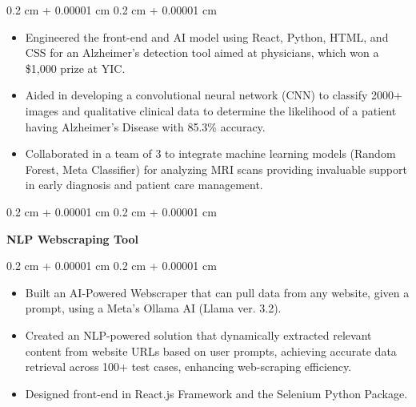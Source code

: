 \documentclass[10pt, letterpaper]{article}
\newenvironment{highlights}{
    \begin{itemize}[
        topsep=0.10 cm,
        parsep=0.10 cm,
        partopsep=0pt,
        itemsep=0pt,
        leftmargin=0.4 cm + 10pt
    ]
}{
    \end{itemize}
} %
\newenvironment{onecolentry}{
    \begin{adjustwidth}{
        0.2 cm + 0.00001 cm
    }{
        0.2 cm + 0.00001 cm
    }
}{
    \end{adjustwidth}
} %
\newenvironment{twocolentry}[2][]{
    \onecolentry
    \def\secondColumn{#2}
    \setcolumnwidth{\fill, 4.5 cm}
    \begin{paracol}{2}
}{
    \switchcolumn \raggedleft \secondColumn
    \end{paracol}
    \endonecolentry
} %
\let\hrefWithoutArrow\href
\renewcommand{\href}[2]{\hrefWithoutArrow{#1}{\ifthenelse{\equal{#2}{}}{ }{#2 }\raisebox{.15ex}{\footnotesize \faExternalLink*}}}
\begin{document}
        \vspace{0.10 cm}
        \begin{onecolentry}
            \begin{highlights}
                \item Engineered the front-end and AI model using React, Python, HTML, and CSS for an Alzheimer’s detection tool aimed at physicians, which won a \$1,000 prize at YIC.
                \item Aided in developing a convolutional neural network (CNN) to classify 2000+ images and qualitative clinical data to determine the likelihood of a patient having Alzheimer's Disease with 85.3\% accuracy.
                \item Collaborated in a team of 3 to integrate machine learning models (Random Forest, Meta Classifier) for analyzing MRI scans providing invaluable support in early diagnosis and patient care management.
            \end{highlights}
        \end{onecolentry}


        \vspace{0.2 cm}

        \begin{twocolentry}{
            
            
        \textit{\href{https://github.com/akramj13/ai-webscrape}{GitHub Link}}}
            \textbf{NLP Webscraping Tool}
        \end{twocolentry}

        \vspace{0.10 cm}
        \begin{onecolentry}
            \begin{highlights}
                \item Built an AI-Powered Webscraper that can pull data from any website, given a prompt, using a Meta's Ollama AI (Llama ver. 3.2).
                \item Created an NLP-powered solution that dynamically extracted relevant content from website URLs based on user prompts, achieving accurate data retrieval across 100+ test cases, enhancing web-scraping efficiency.
                \item Designed front-end in React.js Framework and the Selenium Python Package.
            \end{highlights}
        \end{onecolentry}


        \vspace{0.2 cm}
\end{document}
